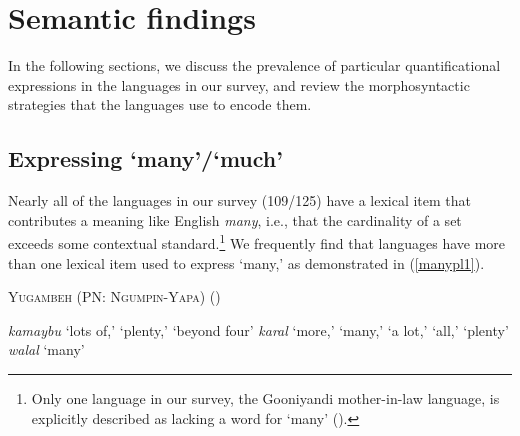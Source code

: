\documentclass[12pt,egregdoesnotlikesansseriftitles]{scrartcl}
\newcommand{\ofy}{/125} %
\begin{document}
\section{Semantic findings \label{individquantsection}}

In the following sections, we discuss the prevalence of particular quantificational expressions in the languages in our survey, and review the morphosyntactic strategies that the languages use to encode them.

\subsection{Expressing `many'/`much' \label{manymuchsection}}

Nearly all of the languages in our survey (109\ofy) have a lexical item that contributes a meaning like English \textit{many}, i.e., that the cardinality of a set exceeds some contextual standard.\footnote{Only one language in our survey, the Gooniyandi mother-in-law language, is explicitly described as lacking a word for `many' (\citealt[636]{mcgregor89}).} We frequently find that languages  have more than one lexical item used to express `many,' as demonstrated in (\ref{manypl1}). %

\begin{exe}
  \ex  \textsc{Yugambeh (PN: Ngumpin-Yapa)} \hfill(\citealt{sharpe98}) \label{manypl1}
  \begin{xlist}
    \ex \textit{kamaybu} `lots of,' `plenty,' `beyond four'
    \ex \textit{karal} `more,' `many,' `a lot,' `all,' `plenty'
    \ex \textit{walal}  `many' 
  \end{xlist} 
\end{exe}
\end{document}
